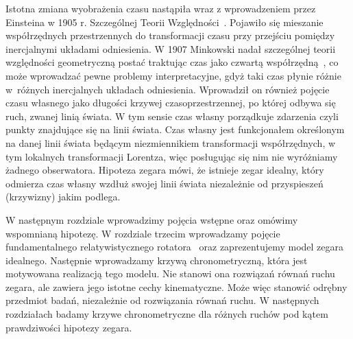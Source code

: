 Istotna zmiana wyobrażenia czasu nastąpiła wraz z wprowadzeniem przez 
Einsteina w 1905 r. Szczególnej Teorii Względności~\cite{einstein}.
Pojawiło się mieszanie współrzędnych 
przestrzennych do transformacji czasu przy przejściu 
pomiędzy inercjalnymi układami odniesienia.
W 1907 Minkowski nadał szczególnej teorii względności 
geometryczną postać traktując czas jako czwartą 
współrzędną~\cite{minkowski2013space}, co może 
wprowadzać pewne problemy interpretacyjne, gdyż taki 
czas płynie różnie w~różnych inercjalnych 
układach odniesienia.
Wprowadził on również pojęcie czasu własnego jako długości 
krzywej czasoprzestrzennej, po której odbywa się 
ruch, zwanej linią świata.
W tym sensie czas własny porządkuje zdarzenia czyli punkty znajdujące
się na linii świata.
Czas własny jest funkcjonałem określonym na danej linii świata 
będącym niezmiennikiem 
transformacji współrzędnych, w tym lokalnych transformacji Lorentza,
więc posługując się nim nie wyróżniamy żadnego obserwatora.
Hipoteza zegara
mówi, że istnieje zegar idealny, który odmierza czas własny 
wzdłuż swojej linii świata niezależnie od przyspieszeń (krzywizny)
jakim podlega.

W następnym rozdziale wprowadzimy pojęcia wstępne oraz omówimy
wspomnianą hipotezę. W rozdziale trzecim wprowadzamy pojęcie 
fundamentalnego relatywistycznego rotatora~\cite{star2008} oraz
zaprezentujemy model zegara idealnego. Następnie 
wprowadzamy krzywą chronometryczną, która jest motywowana 
realizacją tego modelu. Nie stanowi ona rozwiązań równań ruchu
zegara, ale zawiera jego istotne cechy kinematyczne.
Może więc stanowić odrębny przedmiot badań, niezależnie 
od rozwiązania równań ruchu.
W następnych rozdziałach badamy krzywe chronometryczne
dla różnych ruchów pod kątem prawdziwości hipotezy zegara.

